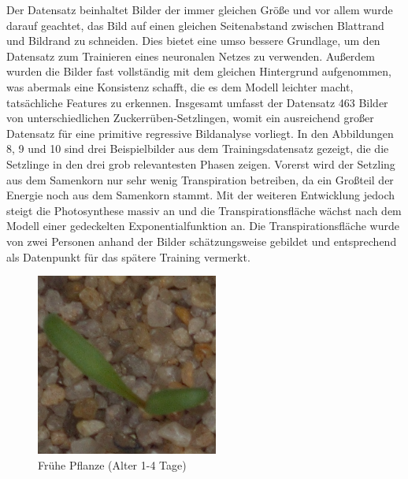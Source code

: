\newline \par
Der Datensatz beinhaltet Bilder der immer gleichen Größe und vor allem wurde darauf geachtet, das Bild auf einen gleichen Seitenabstand zwischen Blattrand und Bildrand zu schneiden. Dies bietet eine umso bessere Grundlage, um den Datensatz zum Trainieren eines neuronalen Netzes zu verwenden. Außerdem wurden die Bilder fast vollständig mit dem gleichen Hintergrund aufgenommen, was abermals eine Konsistenz schafft, die es dem Modell leichter macht, tatsächliche Features zu erkennen. Insgesamt umfasst der Datensatz 463 Bilder von unterschiedlichen Zuckerrüben-Setzlingen, womit ein ausreichend großer Datensatz für eine primitive regressive Bildanalyse vorliegt. In den Abbildungen 8, 9 und 10 sind drei Beispielbilder aus dem Trainingsdatensatz gezeigt, die die Setzlinge in den drei grob relevantesten Phasen zeigen. Vorerst wird der Setzling aus dem Samenkorn nur sehr wenig Transpiration betreiben, da ein Großteil der Energie noch aus dem Samenkorn stammt. Mit der weiteren Entwicklung jedoch steigt die Photosynthese massiv an und die Transpirationsfläche wächst nach dem Modell einer gedeckelten Exponentialfunktion an. Die Transpirationsfläche wurde von zwei Personen anhand der Bilder schätzungsweise gebildet und entsprechend als Datenpunkt für das spätere Training vermerkt.
\begin{figure}
    \centering
    \includegraphics[width=0.6\linewidth]{4.png}
    \caption{Frühe Pflanze (Alter 1-4 Tage)}
    \label{fig:enter-label}
\end{figure}
